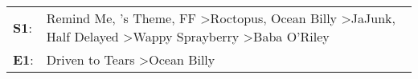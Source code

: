 \begin{supertabular}{p{0.03\textwidth}p{0.92\textwidth}}
 \textbf{S1}:  &  Remind Me\textsuperscript{}, 's Theme\textsuperscript{}, \enspace FF\textsuperscript{} \textgreater \enspace Roctopus\textsuperscript{}, \enspace Ocean Billy\textsuperscript{} \textgreater \enspace JaJunk\textsuperscript{}, \enspace Half Delayed\textsuperscript{} \textgreater \enspace Wappy Sprayberry\textsuperscript{} \textgreater \enspace Baba O'Riley\textsuperscript{}  \enspace  \\
 \textbf{E1}:  &                                                                                                                                                                                                                                                                                                             Driven to Tears\textsuperscript{} \textgreater \enspace Ocean Billy\textsuperscript{}  \enspace  \\
\end{supertabular}
